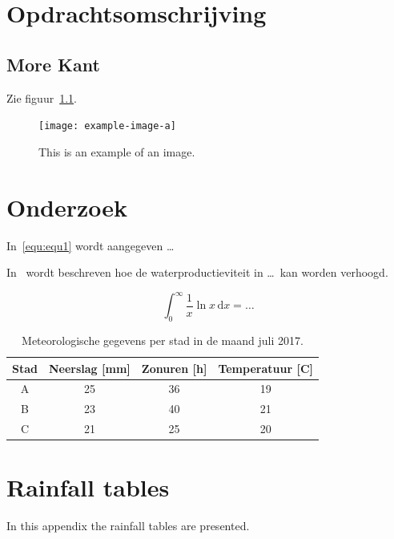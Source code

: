 \documentclass[a4paper,12pt]{book} %
\begin{document}
\chapter{Opdrachtsomschrijving}
\kant[7]
\section{More Kant}
\kant[8]

Zie figuur~\ref{fig:fig1}.

\begin{figure}[!ht]
\centering
\texttt{[image: example-image-a]}
\caption{This is an example of an image.}
\label{fig:fig1}
\end{figure}
\kant[9]

\chapter{Onderzoek}

\kant[1]
In~\eqref{equ:equ1} wordt aangegeven \ldots

In~\cite{oweis2003improving} wordt beschreven hoe de waterproductieviteit in \ldots\ kan worden verhoogd.

\begin{equation}
\label{equ:equ1}
\int_{0}^{\infty} \frac{1}{x}\ln x\, \mathrm{d}x = \ldots
\end{equation}

\begin{table}[!ht]
\centering
\caption{Meteorologische gegevens per stad in de maand juli 2017.}
\label{tab:my-table}
\begin{tabular}{@{}cccc@{}}
\toprule
Stad & Neerslag {[}mm{]} & Zonuren {[}h{]} & Temperatuur {[}C{]} \\ \midrule
A    & 25                & 36              & 19                  \\
B    & 23                & 40              & 21                  \\
C    & 21                & 25              & 20                  \\ \bottomrule
\end{tabular}
\end{table}




\appendix

\chapter{Rainfall tables}
In this appendix the rainfall tables are presented.
\end{document}
